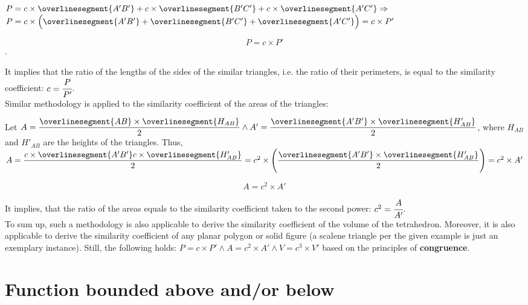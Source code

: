 \documentclass[10pt,a4paper]{article}
\begin{document}
$P = c \times \overlinesegment{A'B'} + c \times \overlinesegment{B'C'} + c 
\times \overlinesegment{A'C'} \Rightarrow$
$P = c \times \Big( \overlinesegment{A'B'} + \overlinesegment{B'C'} + \overlinesegment{A'C'} \Big) = c \times P'$

$$P = c \times P'$$.

It implies that the ratio of the lengths of the sides of the similar triangles, 
i.e. the ratio of their perimeters, is equal to the similarity coefficient:
$c = \cfrac{P}{P'}$. \\

Similar methodology is applied to the similarity coefficient of the areas of the triangles:

Let $A = \dfrac{\overlinesegment{AB} \times \overlinesegment{H_{AB}}}{2} \land 
A' = \dfrac{\overlinesegment{A'B'} \times \overlinesegment{H'_{AB}}}{2}$,
where $H_{AB}$ and $H'_{AB}$ are the heights of the triangles. Thus,
$A = \dfrac{c \times \overlinesegment{A'B'} c \times \overlinesegment{H'_{AB}}}{2} = 
c^2 \times \Bigg( \dfrac{\overlinesegment{A'B'} 
\times \overlinesegment{H'_{AB}}}{2} \Bigg) = c^2 \times A'$

$$A = c^2 \times A'$$

It implies, that the ratio of the areas equals to the similarity coefficient 
taken to the second power: $c^2 = \cfrac{A}{A'}$. \\

To sum up, such a methodology is also applicable to derive the similarity coefficient 
of the volume of the tetrahedron. Moreover, it is also applicable to derive the similarity coefficient
of any planar polygon or solid figure (a scalene triangle per the given example is just an exemplary instance). 
Still, the following holds: $P = c \times P' \land A = c^2 \times A' \land V = c^3 \times V'$ 
based on the principles of \textbf{congruence}.


\section{Function bounded above and/or below}

\end{document}

